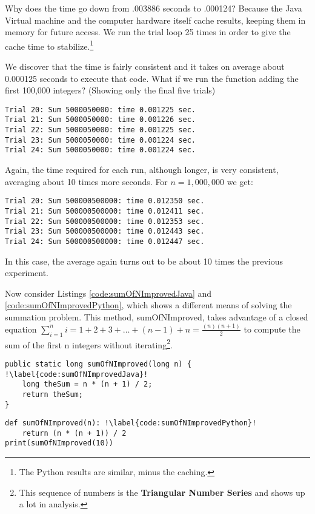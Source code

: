 Why does the time go down from .003886 seconds to .000124? Because the Java Virtual machine and the computer hardware itself cache results, keeping them in memory for future access. We run the trial loop 25 times in order to give the cache time to stabilize.\footnote{The Python results are similar, minus the caching.}

We discover that the time is fairly consistent and it takes on average about 0.000125 seconds to execute that code. What if we run the function adding the first 100,000 integers? (Showing only the final five trials)

\begin{verbatim}
Trial 20: Sum 5000050000: time 0.001225 sec.
Trial 21: Sum 5000050000: time 0.001226 sec.
Trial 22: Sum 5000050000: time 0.001225 sec.
Trial 23: Sum 5000050000: time 0.001224 sec.
Trial 24: Sum 5000050000: time 0.001224 sec.
\end{verbatim}


Again, the time required for each run, although longer, is very consistent, averaging about 10 times more seconds. For $n = 1,000,000$  we get:

\begin{verbatim}
Trial 20: Sum 500000500000: time 0.012350 sec.
Trial 21: Sum 500000500000: time 0.012411 sec.
Trial 22: Sum 500000500000: time 0.012353 sec.
Trial 23: Sum 500000500000: time 0.012443 sec.
Trial 24: Sum 500000500000: time 0.012447 sec.
\end{verbatim}

In this case, the average again turns out to be about 10 times the previous experiment.

Now consider Listings \ref{code:sumOfNImprovedJava} and \ref{code:sumOfNImprovedPython}, which shows a different means of solving the summation problem. This method, sumOfNImproved, takes advantage of a closed equation $\sum_{i=1}^{n} i = 1+2+3+\dots+(n-1)+n =  \frac {(n)(n+1)}{2}$
to compute the sum of the first n integers without iterating\footnote{This sequence of numbers is the \textbf{Triangular Number Series} and shows up a lot in analysis.}.

\begin{verbatim}
public static long sumOfNImproved(long n) { !\label{code:sumOfNImprovedJava}!
	long theSum = n * (n + 1) / 2;
	return theSum;
}
\end{verbatim}


\begin{verbatim}
def sumOfNImproved(n): !\label{code:sumOfNImprovedPython}!
	return (n * (n + 1)) / 2
print(sumOfNImproved(10))
\end{verbatim}

